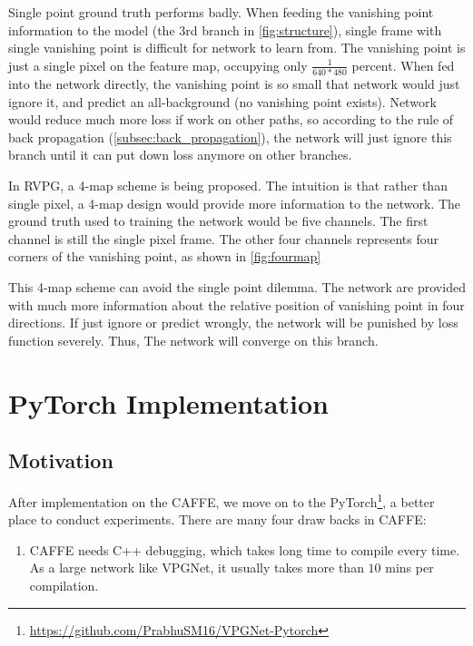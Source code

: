 \begin{spacing}{1.5}
Single point ground truth performs badly. When feeding the vanishing point information to the model (the  $3$rd branch in \autoref{fig:structure}), single frame with single vanishing point is difficult for network to learn from. The vanishing point is just a single pixel on the feature map, occupying only $\frac{1}{640*480}$ percent. When fed into the network directly, the vanishing point is so small that network would just ignore it, and predict an all-background (no vanishing point exists). Network would reduce much more loss if work on other paths, so according to the rule of back propagation (\autoref{subsec:back_propagation}), the network will just ignore this branch until it can put down loss anymore on other branches.

In RVPG, a 4-map scheme is being proposed. The intuition is that rather than single pixel, a 4-map design would provide more information to the network. The ground truth used to training the network would be five channels. The first channel is still the single pixel frame. The other four channels represents four corners of the vanishing point, as shown in \autoref{fig:fourmap}

This 4-map scheme can avoid the single point dilemma. The network are provided with much more information about the relative position of vanishing point in four directions. If just ignore or predict wrongly, the network will be punished by loss function severely. Thus, The network will converge on this branch.

\section{PyTorch Implementation}
\label{sec:MD_PyTorch}

\subsection{Motivation}

After implementation on the CAFFE, we move on to the PyTorch\footnote{\url{https://github.com/PrabhuSM16/VPGNet-Pytorch}}, a better place to conduct experiments. There are many four draw backs in CAFFE: 

\begin{enumerate}

    \item CAFFE needs C++ debugging, which takes long time to compile every time. As a large network like VPGNet, it usually takes more than $10$ mins per compilation.


\end{enumerate}
\end{spacing}
